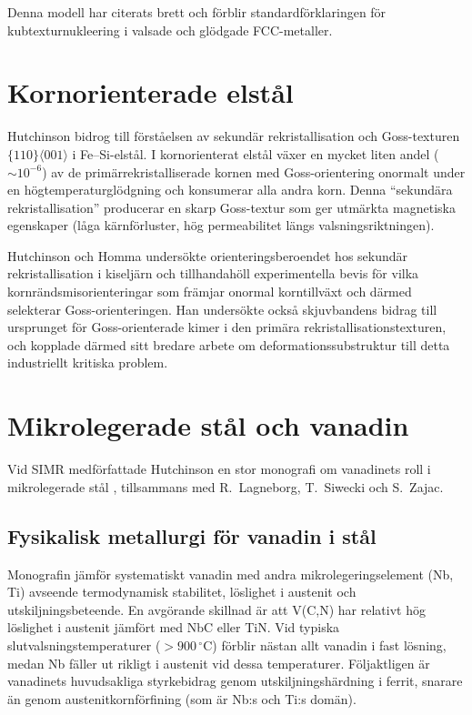 \documentclass[11pt,a4paper]{article}
\begin{document}
Denna modell har citerats brett och f\"orblir standardf\"orklaringen
f\"or kubtexturnukleering i valsade och gl\"odgade FCC-metaller.

\section{Kornorienterade elst\aa{}l}
\label{sec:goss}

Hutchinson bidrog till f\"orst\aa{}elsen av sekund\"ar rekristallisation
och Goss-texturen $\{110\}\langle 001\rangle$ i Fe--Si-elst\aa{}l.  I
kornorienterat elst\aa{}l v\"axer en mycket liten andel
($\sim\!10^{-6}$) av de prim\"arrekristalliserade kornen med
Goss-orientering onormalt under en h\"ogtemperaturgl\"odgning och
konsumerar alla andra korn.  Denna ``sekund\"ara rekristallisation''
producerar en skarp Goss-textur som ger utm\"arkta magnetiska egenskaper
(l\aa{}ga k\"arnf\"orluster, h\"og permeabilitet l\"angs
valsningsriktningen).

Hutchinson och Homma \cite{Homma2003} unders\"okte orienteringsberoendet
hos sekund\"ar rekristallisation i kiselj\"arn och tillhandah\"oll
experimentella bevis f\"or vilka kornr\"andsmisorienteringar som
fr\"amjar onormal korntillv\"axt och d\"armed selekterar
Goss-orienteringen.  Han unders\"okte ocks\aa{} skjuvbandens bidrag
till ursprunget f\"or Goss-orienterade kimer i den prim\"ara
rekristallisationstexturen, och kopplade d\"armed sitt bredare arbete om
deformationssubstruktur till detta industriellt kritiska problem.

\section{Mikrolegerade st\aa{}l och vanadin}
\label{sec:microalloy}

Vid SIMR medf\"orfattade Hutchinson en stor monografi om vanadinets roll
i mikrolegerade st\aa{}l \cite{Lagneborg2014}, tillsammans med
R.~Lagneborg, T.~Siwecki och S.~Zajac.

\subsection{Fysikalisk metallurgi f\"or vanadin i st\aa{}l}

Monografin j\"amf\"or systematiskt vanadin med andra
mikrolegeringselement (Nb, Ti) avseende termodynamisk stabilitet,
l\"oslighet i austenit och utskiljningsbeteende.  En avg\"orande
skillnad \"ar att V(C,N) har relativt h\"og l\"oslighet i austenit
j\"amf\"ort med NbC eller TiN.  Vid typiska slutvalsningstemperaturer
($>900\,{}^\circ$C) f\"orblir n\"astan allt vanadin i fast l\"osning,
medan Nb f\"aller ut rikligt i austenit vid dessa temperaturer.
F\"oljaktligen \"ar vanadinets huvudsakliga styrkebidrag genom
utskiljningsh\"ardning i ferrit, snarare \"an genom
austenitkornf\"orfining (som \"ar Nb:s och Ti:s dom\"an).
\end{document}
